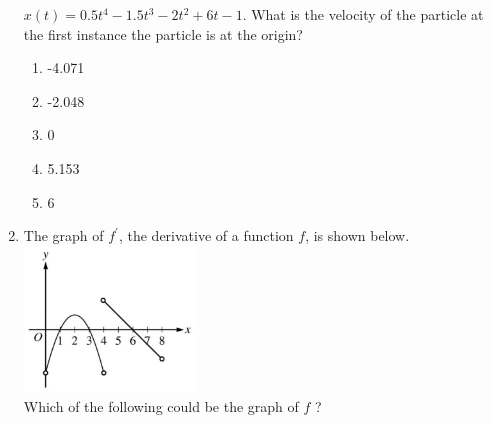 \documentclass{article}
\begin{document}
\begin{enumerate}
\begin{minipage}[t]{\linewidth}
\(x(t)=0.5 t^{4}-1.5 t^{3}-2 t^{2}+6 t-1\). What is the velocity of the
particle at the first instance the particle is at the origin?
\vspace{1em}
		\begin{enumerate}
		\itemsep1em
			\item -4.071
			\item -2.048
			\item 0
			\item 5.153
			\item 6
		\end{enumerate}
	\end{minipage}
	\item
	\begin{minipage}[t]{\linewidth}
		The graph of \(f^{\prime}\), the derivative of a function \(f\), is
shown below.\\
\includegraphics[width=1.78in]{media/8e560a60-029c-51b9-b81d-21c20bfc3c39.jpg}\\
Which of the following could be the graph of \(f\) ?


\end{minipage}
\end{enumerate}
\end{document}
